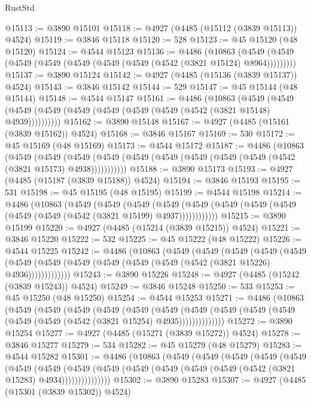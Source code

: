 \begin{lexlean}{RustStd}
\begin{coremodule}
@15113 := @3890 @15101
@15118 := @4927 (@4485 (@15112 (@3839 @15113)) @4524)
@15119 := @3846 @15118
@15120 := 528
@15123 := @45 @15120 (@48 @15120)
@15124 := @4544 @15123
@15136 := @4486
    (@10863 (@4549 (@4549 (@4549 (@4549 (@4549 (@4549 (@4549 (@4542 (@3821 @15124) @8964)))))))))
@15137 := @3890 @15124
@15142 := @4927 (@4485 (@15136 (@3839 @15137)) @4524)
@15143 := @3846 @15142
@15144 := 529
@15147 := @45 @15144 (@48 @15144)
@15148 := @4544 @15147
@15161 := @4486
    (@10863
      (@4549 (@4549 (@4549 (@4549 (@4549 (@4549 (@4549 (@4549 (@4542 (@3821 @15148) @4939))))))))))
@15162 := @3890 @15148
@15167 := @4927 (@4485 (@15161 (@3839 @15162)) @4524)
@15168 := @3846 @15167
@15169 := 530
@15172 := @45 @15169 (@48 @15169)
@15173 := @4544 @15172
@15187 := @4486
    (@10863
      (@4549
        (@4549
          (@4549 (@4549 (@4549 (@4549 (@4549 (@4549 (@4549 (@4542 (@3821 @15173) @4938)))))))))))
@15188 := @3890 @15173
@15193 := @4927 (@4485 (@15187 (@3839 @15188)) @4524)
@15194 := @3846 @15193
@15195 := 531
@15198 := @45 @15195 (@48 @15195)
@15199 := @4544 @15198
@15214 := @4486
    (@10863
      (@4549
        (@4549
          (@4549
            (@4549 (@4549 (@4549 (@4549 (@4549 (@4549 (@4549 (@4542 (@3821 @15199) @4937))))))))))))
@15215 := @3890 @15199
@15220 := @4927 (@4485 (@15214 (@3839 @15215)) @4524)
@15221 := @3846 @15220
@15222 := 532
@15225 := @45 @15222 (@48 @15222)
@15226 := @4544 @15225
@15242 := @4486
    (@10863
      (@4549
        (@4549
          (@4549
            (@4549
              (@4549
                (@4549 (@4549 (@4549 (@4549 (@4549 (@4549 (@4542 (@3821 @15226) @4936)))))))))))))
@15243 := @3890 @15226
@15248 := @4927 (@4485 (@15242 (@3839 @15243)) @4524)
@15249 := @3846 @15248
@15250 := 533
@15253 := @45 @15250 (@48 @15250)
@15254 := @4544 @15253
@15271 := @4486
    (@10863
      (@4549
        (@4549
          (@4549
            (@4549
              (@4549
                (@4549
                  (@4549
                    (@4549 (@4549 (@4549 (@4549 (@4549 (@4542 (@3821 @15254) @4935))))))))))))))
@15272 := @3890 @15254
@15277 := @4927 (@4485 (@15271 (@3839 @15272)) @4524)
@15278 := @3846 @15277
@15279 := 534
@15282 := @45 @15279 (@48 @15279)
@15283 := @4544 @15282
@15301 := @4486
    (@10863
      (@4549
        (@4549
          (@4549
            (@4549
              (@4549
                (@4549
                  (@4549
                    (@4549
                      (@4549 (@4549 (@4549 (@4549 (@4549 (@4542 (@3821 @15283) @4934)))))))))))))))
@15302 := @3890 @15283
@15307 := @4927 (@4485 (@15301 (@3839 @15302)) @4524)

\end{coremodule}
\end{lexlean}

